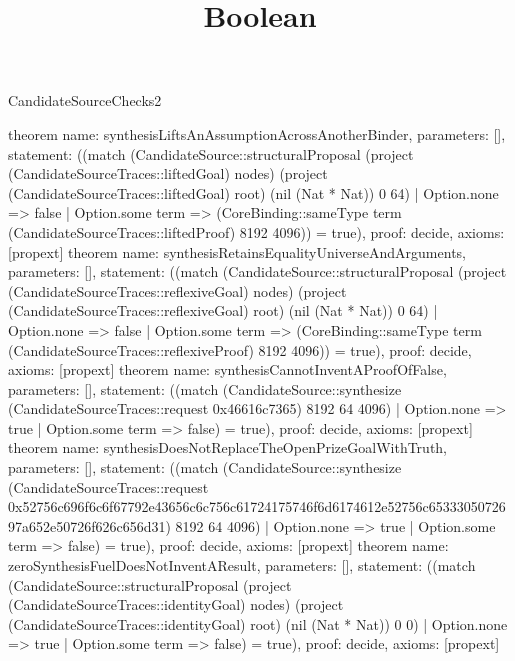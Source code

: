 \begin{lexlean}{CandidateSourceChecks2}
\title{Boolean}
\begin{semanticmodule}
theorem{
 name: synthesisLiftsAnAssumptionAcrossAnotherBinder,
 parameters: [],
 statement: ((match (CandidateSource::structuralProposal (project (CandidateSourceTraces::liftedGoal) nodes) (project (CandidateSourceTraces::liftedGoal) root) (nil (Nat * Nat)) 0 64) | Option.none => false | Option.some term => (CoreBinding::sameType term (CandidateSourceTraces::liftedProof) 8192 4096)) = true),
 proof: decide{},
 axioms: [propext]
}
theorem{
 name: synthesisRetainsEqualityUniverseAndArguments,
 parameters: [],
 statement: ((match (CandidateSource::structuralProposal (project (CandidateSourceTraces::reflexiveGoal) nodes) (project (CandidateSourceTraces::reflexiveGoal) root) (nil (Nat * Nat)) 0 64) | Option.none => false | Option.some term => (CoreBinding::sameType term (CandidateSourceTraces::reflexiveProof) 8192 4096)) = true),
 proof: decide{},
 axioms: [propext]
}
theorem{
 name: synthesisCannotInventAProofOfFalse,
 parameters: [],
 statement: ((match (CandidateSource::synthesize (CandidateSourceTraces::request 0x46616c7365) 8192 64 4096) | Option.none => true | Option.some term => false) = true),
 proof: decide{},
 axioms: [propext]
}
theorem{
 name: synthesisDoesNotReplaceTheOpenPrizeGoalWithTruth,
 parameters: [],
 statement: ((match (CandidateSource::synthesize (CandidateSourceTraces::request 0x52756c696f6c6f67792e43656c6c756c61724175746f6d6174612e52756c6533305072697a652e50726f626c656d31) 8192 64 4096) | Option.none => true | Option.some term => false) = true),
 proof: decide{},
 axioms: [propext]
}
theorem{
 name: zeroSynthesisFuelDoesNotInventAResult,
 parameters: [],
 statement: ((match (CandidateSource::structuralProposal (project (CandidateSourceTraces::identityGoal) nodes) (project (CandidateSourceTraces::identityGoal) root) (nil (Nat * Nat)) 0 0) | Option.none => true | Option.some term => false) = true),
 proof: decide{},
 axioms: [propext]
}
\end{semanticmodule}
\end{lexlean}
